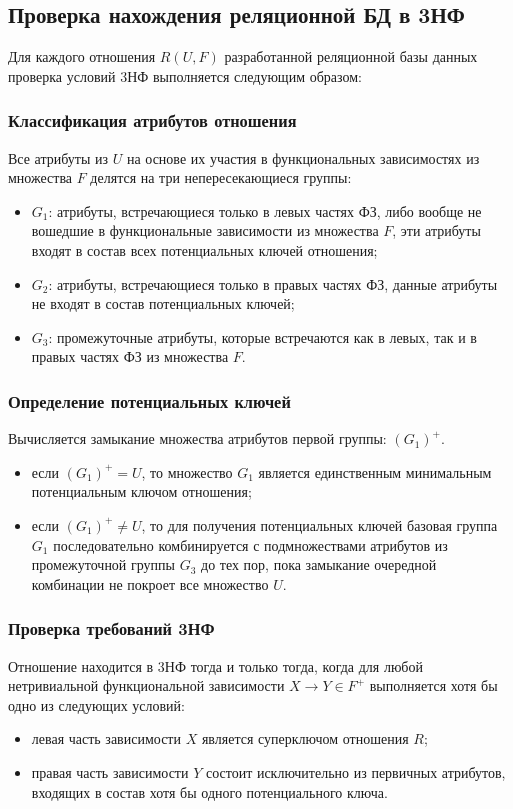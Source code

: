 \subsection[Проверка нахождения реляционной БД в 3НФ]{Проверка нахождения реляционной БД в 3НФ}

Для каждого отношения $R(U, F)$ разработанной реляционной базы данных проверка условий 3НФ 
выполняется следующим образом:

\subsubsection*{Классификация атрибутов отношения}
Все атрибуты из $U$ на основе их участия в функциональных зависимостях из множества $F$ делятся на 
три непересекающиеся группы:
\begin{itemize}
    \item $G_1$: атрибуты, встречающиеся только в левых частях ФЗ, либо вообще не 
    вошедшие в функциональные зависимости из множества $F$, эти атрибуты 
    входят в состав всех потенциальных ключей отношения;
    \item $G_2$: атрибуты, встречающиеся только в правых частях ФЗ, данные атрибуты 
    не входят в состав потенциальных ключей;
    \item $G_3$: промежуточные атрибуты, которые встречаются как в левых, так 
    и в правых частях ФЗ из множества $F$.
\end{itemize}

\subsubsection*{Определение потенциальных ключей}
Вычисляется замыкание множества атрибутов первой группы: $(G_1)^+$.
\begin{itemize}
    \item если $(G_1)^+ = U$, то множество $G_1$ является единственным минимальным потенциальным ключом отношения;
    \item если $(G_1)^+ \neq U$, то для получения потенциальных ключей базовая группа $G_1$ 
    последовательно комбинируется с подмножествами атрибутов из промежуточной группы $G_3$ до тех 
    пор, пока замыкание очередной комбинации не покроет все множество $U$.
\end{itemize}

\subsubsection*{Проверка требований 3НФ}
Отношение находится в 3НФ тогда и только тогда, когда для любой 
нетривиальной функциональной зависимости $X \to Y \in F^+$ выполняется хотя бы одно из следующих условий:
\begin{itemize}
    \item левая часть зависимости $X$ является суперключом отношения $R$;
    \item правая часть зависимости $Y$ состоит исключительно из первичных атрибутов, 
    входящих в состав хотя бы одного потенциального ключа.
\end{itemize}

